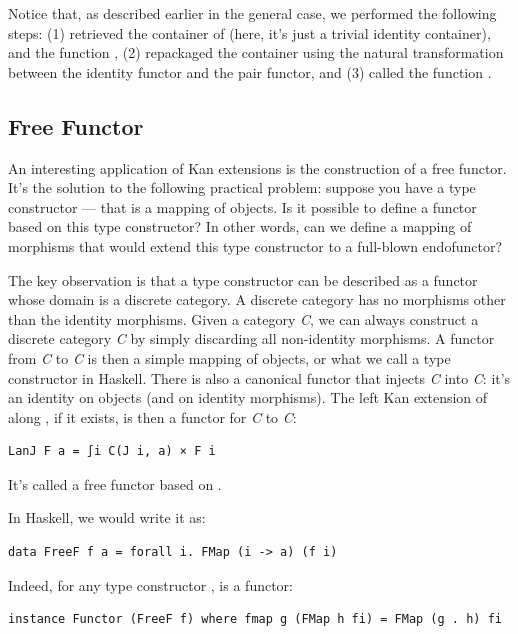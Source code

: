 Notice that, as described earlier in the general case, we performed the
following steps: (1) retrieved the container of  (here, it's
just a trivial identity container), and the function , (2)
repackaged the container using the natural transformation between the
identity functor and the pair functor, and (3) called the function
.

\subsection{Free Functor}\label{free-functor}

An interesting application of Kan extensions is the construction of a
free functor. It's the solution to the following practical problem:
suppose you have a type constructor --- that is a mapping of objects. Is
it possible to define a functor based on this type constructor? In other
words, can we define a mapping of morphisms that would extend this type
constructor to a full-blown endofunctor?

The key observation is that a type constructor can be described as a
functor whose domain is a discrete category. A discrete category has no
morphisms other than the identity morphisms. Given a category \emph{C},
we can always construct a discrete category \emph{\textbar{}C\textbar{}}
by simply discarding all non-identity morphisms. A functor 
from \emph{\textbar{}C\textbar{}} to \emph{C} is then a simple mapping
of objects, or what we call a type constructor in Haskell. There is also
a canonical functor  that injects \emph{\textbar{}C\textbar{}}
into \emph{C}: it's an identity on objects (and on identity morphisms).
The left Kan extension of  along , if it exists, is
then a functor for \emph{C} to \emph{C}:

\begin{verbatim}
LanJ F a = ∫i C(J i, a) × F i
\end{verbatim}

It's called a free functor based on .

In Haskell, we would write it as:

\begin{verbatim}
data FreeF f a = forall i. FMap (i -> a) (f i)
\end{verbatim}

Indeed, for any type constructor ,  is a
functor:

\begin{verbatim}
instance Functor (FreeF f) where fmap g (FMap h fi) = FMap (g . h) fi
\end{verbatim}

